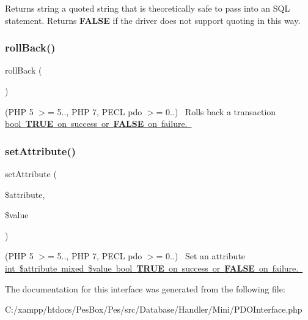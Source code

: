 \begin{DoxyReturn}{Returns}
string a quoted string that is theoretically safe to pass into an S\+QL statement. Returns {\bfseries F\+A\+L\+SE} if the driver does not support quoting in this way. 
\end{DoxyReturn}
\mbox{\label{interface_pes_1_1_database_1_1_handler_1_1_mini_1_1_p_d_o_interface_aebaea4cae21e0e75ec1489c1648caeb3}} 
\subsubsection{\texorpdfstring{roll\+Back()}{rollBack()}}
{\footnotesize\ttfamily roll\+Back (\begin{DoxyParamCaption}{ }\end{DoxyParamCaption})}

(P\+HP 5 $>$= 5.., P\+HP 7, P\+E\+CL pdo $>$= 0..)~\newline
 Rolls back a transaction \mbox{\hyperlink{}{bool {\bfseries T\+R\+UE} on success or {\bfseries F\+A\+L\+SE} on failure. }}\mbox{\label{interface_pes_1_1_database_1_1_handler_1_1_mini_1_1_p_d_o_interface_aa4ddbee482d43ef83316a45744be018e}} 
\subsubsection{\texorpdfstring{set\+Attribute()}{setAttribute()}}
{\footnotesize\ttfamily set\+Attribute (\begin{DoxyParamCaption}\item[{}]{\$attribute,  }\item[{}]{\$value }\end{DoxyParamCaption})}

(P\+HP 5 $>$= 5.., P\+HP 7, P\+E\+CL pdo $>$= 0..)~\newline
 Set an attribute \mbox{\hyperlink{}{int \$attribute  mixed \$value  bool {\bfseries T\+R\+UE} on success or {\bfseries F\+A\+L\+SE} on failure. }}

The documentation for this interface was generated from the following file\+:\begin{DoxyCompactItemize}
\item 
C\+:/xampp/htdocs/\+Pes\+Box/\+Pes/src/\+Database/\+Handler/\+Mini/P\+D\+O\+Interface.\+php\end{DoxyCompactItemize}
